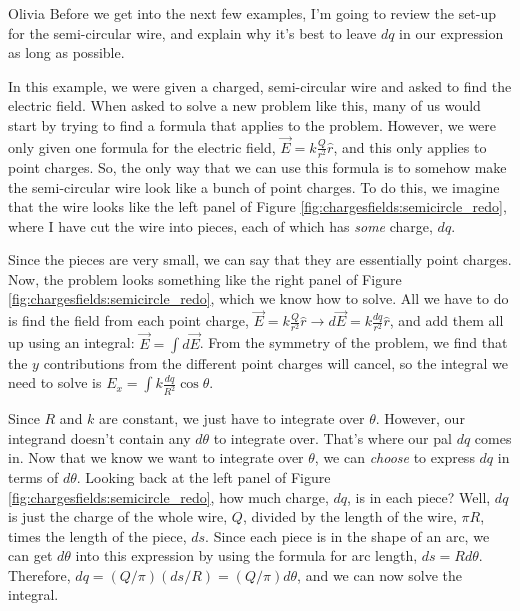 \begin{studentOpinion}{Olivia}
Before we get into the next few examples, I'm going to review the set-up for the  semi-circular wire, and explain why it's best to leave $dq$ in our expression as long as possible.

In this example, we were given a charged, semi-circular wire and asked to find the electric field. When asked to solve a new problem like this, many of us would start by trying to find a formula that applies to the problem. However, we were only given one formula for the electric field, $\vec E = k\frac{Q}{r^2}\hat r$, and this only applies to point charges. So, the only way that we can use this formula is to somehow make the semi-circular wire look like a bunch of point charges. To do this, we imagine that the wire looks like the left panel of Figure \ref{fig:chargesfields:semicircle_redo}, where I have cut the wire into pieces, each of which has \textit{some} charge, $dq$. 

 Since the pieces are very small, we can say that they are essentially point charges. Now, the problem looks something like the right panel of Figure \ref{fig:chargesfields:semicircle_redo}, which we know how to solve. All we have to do is find the field from each point charge, $\vec E = k\frac{Q}{r^2}\hat r \rightarrow d\vec E = k\frac{dq}{r^2}\hat r$, and add them all up using an integral: $\vec E=\int d\vec E$. From the symmetry of the problem, we find that the $y$ contributions from the different point charges will cancel, so the  integral we need to solve is $E_x=\int k\frac{dq}{R^2}\cos\theta$.  

Since $R$ and $k$ are constant, we just have to integrate over $\theta$. However, our integrand doesn't contain any $d\theta$ to integrate over. That's where our pal $dq$ comes in. Now that we know we want to integrate over $\theta$, we can \textit{choose} to express $dq$ in terms of $d\theta$. Looking back at the left panel of Figure \ref{fig:chargesfields:semicircle_redo}, how much charge, $dq$, is in each piece? Well, $dq$ is just the charge of the whole wire, $Q$, divided by the length of the wire, $\pi R$, times the length of the piece, $ds$. Since each piece is in the shape of an arc, we can get $d\theta$ into this expression by using the formula for arc length, $ds=Rd\theta$. Therefore, $dq=(Q/\pi)( ds/R)=(Q/\pi)d\theta$, and we can now solve the integral.
\end{studentOpinion}

